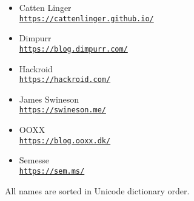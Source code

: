 


\newcommand{\sgitem}[2]{
    \noindent%
    \parbox[t][16mm][t]{\linewidth}{%
    \parskip=3pt
        \rmfamily\Large\mdseries\strut#1\par
        \ttfamily\small\mdseries\strut\href{#2}{#2}\par
    }\par
}
\newcommand{\sgitemalt}[2]{
    \item \textrm{\large#1}\nopagebreak\\\nopagebreak\texttt{\small\href{#2}{#2}}
}



\begin{itemize}
    \sgitemalt{Catten Linger}{https://cattenlinger.github.io/}
    \sgitemalt{Dimpurr}{https://blog.dimpurr.com/}
    \sgitemalt{Hackroid}{https://hackroid.com/}
    \sgitemalt{James Swineson}{https://swineson.me/}
    \sgitemalt{OOXX}{https://blog.ooxx.dk/}
    \sgitemalt{Semesse}{https://sem.ms/}
\end{itemize}


\vskip 20mm\vfill\small\rmfamily
All names are sorted in Unicode dictionary order.




